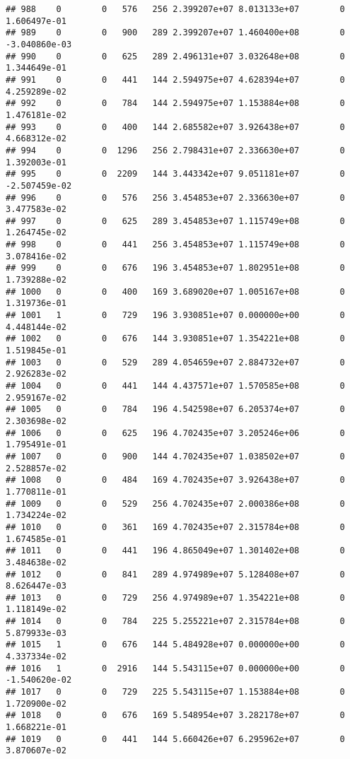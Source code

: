 \documentclass[
]{article}
\begin{document}
\begin{enumerate}
\begin{verbatim}
## 988    0        0   576   256 2.399207e+07 8.013133e+07        0  1.606497e-01
## 989    0        0   900   289 2.399207e+07 1.460400e+08        0 -3.040860e-03
## 990    0        0   625   289 2.496131e+07 3.032648e+08        0  1.344649e-01
## 991    0        0   441   144 2.594975e+07 4.628394e+07        0  4.259289e-02
## 992    0        0   784   144 2.594975e+07 1.153884e+08        0  1.476181e-02
## 993    0        0   400   144 2.685582e+07 3.926438e+07        0  4.668312e-02
## 994    0        0  1296   256 2.798431e+07 2.336630e+07        0  1.392003e-01
## 995    0        0  2209   144 3.443342e+07 9.051181e+07        0 -2.507459e-02
## 996    0        0   576   256 3.454853e+07 2.336630e+07        0  3.477583e-02
## 997    0        0   625   289 3.454853e+07 1.115749e+08        0  1.264745e-02
## 998    0        0   441   256 3.454853e+07 1.115749e+08        0  3.078416e-02
## 999    0        0   676   196 3.454853e+07 1.802951e+08        0  1.739288e-02
## 1000   0        0   400   169 3.689020e+07 1.005167e+08        0  1.319736e-01
## 1001   1        0   729   196 3.930851e+07 0.000000e+00        0  4.448144e-02
## 1002   0        0   676   144 3.930851e+07 1.354221e+08        0  1.519845e-01
## 1003   0        0   529   289 4.054659e+07 2.884732e+07        0  2.926283e-02
## 1004   0        0   441   144 4.437571e+07 1.570585e+08        0  2.959167e-02
## 1005   0        0   784   196 4.542598e+07 6.205374e+07        0  2.303698e-02
## 1006   0        0   625   196 4.702435e+07 3.205246e+06        0  1.795491e-01
## 1007   0        0   900   144 4.702435e+07 1.038502e+07        0  2.528857e-02
## 1008   0        0   484   169 4.702435e+07 3.926438e+07        0  1.770811e-01
## 1009   0        0   529   256 4.702435e+07 2.000386e+08        0  1.734224e-02
## 1010   0        0   361   169 4.702435e+07 2.315784e+08        0  1.674585e-01
## 1011   0        0   441   196 4.865049e+07 1.301402e+08        0  3.484638e-02
## 1012   0        0   841   289 4.974989e+07 5.128408e+07        0  8.626447e-03
## 1013   0        0   729   256 4.974989e+07 1.354221e+08        0  1.118149e-02
## 1014   0        0   784   225 5.255221e+07 2.315784e+08        0  5.879933e-03
## 1015   1        0   676   144 5.484928e+07 0.000000e+00        0  4.337334e-02
## 1016   1        0  2916   144 5.543115e+07 0.000000e+00        0 -1.540620e-02
## 1017   0        0   729   225 5.543115e+07 1.153884e+08        0  1.720900e-02
## 1018   0        0   676   169 5.548954e+07 3.282178e+07        0  1.668221e-01
## 1019   0        0   441   144 5.660426e+07 6.295962e+07        0  3.870607e-02

\end{verbatim}
\end{enumerate}
\end{document}
